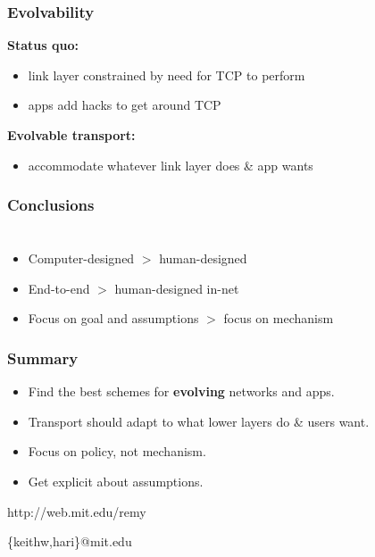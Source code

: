 \documentclass[svgnames]{beamer}
\newcommand{\ssline}{\vspace{8 pt}}
\begin{document}
\begin{frame}
\frametitle{Evolvability}

\textbf{Status quo:}

\begin{itemize}

\item link layer constrained by need for TCP to perform
\item apps add hacks to get around TCP

\end{itemize}

\textbf{Evolvable transport:}

\begin{itemize}

\item accommodate whatever link layer does \& app wants

\end{itemize}

\end{frame}

\begin{frame}
\frametitle{Conclusions}

\section{}

\begin{itemize}

\item Computer-designed $>$ human-designed

\item End-to-end $>$ human-designed in-net

\item Focus on goal and assumptions $>$ focus on mechanism

\end{itemize}

\end{frame}

\begin{frame}
\frametitle{Summary}

\begin{itemize}

\item Find the best schemes for \textbf{evolving} networks and apps.

\item Transport should adapt to what lower layers do \& users want.

\item Focus on policy, not mechanism.

\item Get explicit about assumptions.

\end{itemize}

\ssline

\begin{centering}

http://web.mit.edu/remy

\{keithw,hari\}@mit.edu

\end{centering}

\end{frame}
\end{document}
